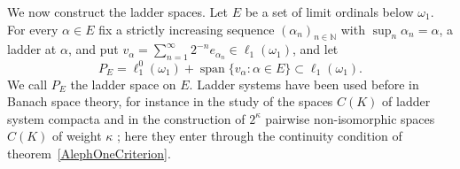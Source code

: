 \documentclass[12pt]{article}
\newcommand{\lo}[1]{\ell_1^0(#1)}
\newcommand{\ellone}[1]{\ell_1(#1)}
\newcommand{\Lin}{\operatorname{span}}
\begin{document}
We now construct the ladder spaces.
Let $E$ be a set of limit ordinals below $\omega_1$. For every $\alpha\in E$
fix a strictly increasing sequence ${(\alpha_n)}_{n\in\mathbb{N}}$ with
$\sup_n\alpha_n=\alpha$, a ladder at $\alpha$, and put
$v_\alpha=\sum_{n=1}^\infty 2^{-n}e_{\alpha_n}\in\ellone{\omega_1}$, and let
\[
P_E=\lo{\omega_1}+\Lin\{v_\alpha:\alpha\in E\}\subset\ellone{\omega_1}.
\]
We call $P_E$ the ladder space on $E$. Ladder systems have been used before
in Banach space theory, for instance in the study of the spaces $C(K)$ of
ladder system compacta \cite{FerrerKoszmiderKubisLadder} and in the
construction of $2^\kappa$ pairwise non-isomorphic spaces $C(K)$ of weight
$\kappa$ \cite{KorpalskiKoszmiderMarciszewskiCounting}; here they enter
through the continuity condition of theorem~\ref{AlephOneCriterion}.
\end{document}

